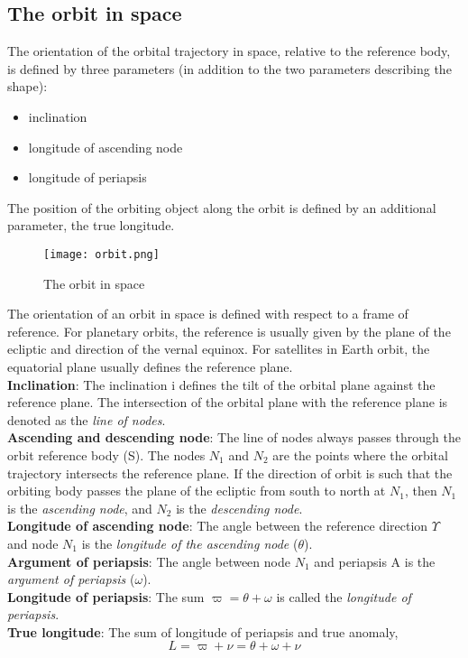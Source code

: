 \documentclass[Orbiter Developer Manual.tex]{subfiles}
\begin{document}
\subsection{The orbit in space}

The orientation of the orbital trajectory in space, relative to the reference body, is defined by three parameters (in addition to the two parameters describing the shape):
\begin{itemize}
\item inclination
\item longitude of ascending node
\item longitude of periapsis
\end{itemize}

\noindent
The position of the orbiting object along the orbit is defined by an additional parameter, the true longitude.

\begin{figure}[H]
  \centering
  \texttt{[image: orbit.png]}
  \caption{The orbit in space}
\end{figure}

\noindent
The orientation of an orbit in space is defined with respect to a frame of reference. For planetary orbits, the reference is usually given by the plane of the ecliptic and direction of the vernal equinox. For satellites in Earth orbit, the equatorial plane usually defines the reference plane.\\
\textbf{Inclination}: The inclination i defines the tilt of the orbital plane against the reference plane. The intersection of the orbital plane with the reference plane is denoted as the \textit{line of nodes}.\\
\textbf{Ascending and descending node}: The line of nodes always passes through the orbit reference body (S).
The nodes $N_{1}$ and $N_{2}$ are the points where the orbital trajectory intersects the reference plane. If the direction of orbit is such that the orbiting body passes the plane of the ecliptic from south to north at $N_{1}$, then $N_{1}$ is the \textit{ascending node}, and $N_{2}$ is the \textit{descending node}.\\
\textbf{Longitude of ascending node}: The angle between the reference direction $\Upsilon$ and node $N_{1}$ is the \textit{longitude of the ascending node} ($\theta$).\\
\textbf{Argument of periapsis}: The angle between node $N_{1}$ and periapsis A is the \textit{argument of periapsis} ($\omega$).\\
\textbf{Longitude of periapsis}: The sum $\varpi = \theta + \omega$ is called the \textit{longitude of periapsis}.\\
\textbf{True longitude}: The sum of longitude of periapsis and true anomaly,
\[ L = \varpi + \nu = \theta + \omega + \nu \]
\end{document}
